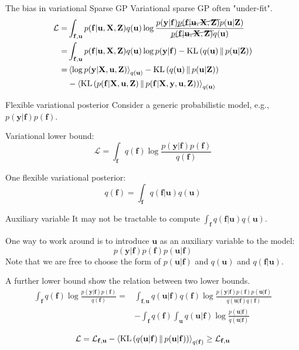 \documentclass[14pt,aspectratio=1610]{beamer}
\newcommand{\yV}{\mathbf{y}}
\newcommand{\fV}{\mathbf{f}}
\newcommand{\xM}{\mathbf{X}}
\newcommand{\uV}{\mathbf{u}}
\newcommand{\zM}{\mathbf{Z}}
\newcommand{\bound}{\mathcal{L}}
\begin{document}
\begin{frame}{The bias in variational Sparse GP}
Variational sparse GP often "under-fit".
\begin{align*}
\bound =& \int_{\fV, \uV} p(\fV| \uV, \xM, \zM) q(\uV) \log \frac{p(\yV | \fV) \cancel{p(\fV| \uV, \xM, \zM)} p(\uV | \zM)}{\cancel{p(\fV| \uV, \xM, \zM)} q(\uV)} \\
=& \int_{\fV, \uV} p(\fV| \uV, \xM, \zM) q(\uV) \log p(\yV | \fV)  - \KL{q(\uV)}{p(\uV| \zM)}\\
=& \expectation{\log p(\yV | \xM, \uV, \zM)}_{q(\uV)} - \KL{q(\uV)}{p(\uV| \zM)} \\
& - \expectation{\KL{p(\fV|\xM, \uV, \zM)}{p(\fV|\xM, \yV, \uV, \zM)}}_{q(\uV)}
\end{align*}
\end{frame}

\begin{frame}{Flexible variational posterior}
Consider a generic probabilistic model, e.g., $p(\yV | \fV) p(\fV)$.

Variational lower bound:
\[
\bound = \int_{\fV} q(\fV) \log \frac{p(\yV | \fV) p(\fV)}{q(\fV)}
\]

One flexible variational posterior:
\[
q(\fV) = \int_{\fV} q(\fV|\uV) q(\uV)
\]
\end{frame}

\begin{frame}{Auxiliary variable}
It may not be tractable to compute $ \int_{\fV} q(\fV|\uV) q(\uV)$.

One way to work around is to introduce $\uV$ as an auxiliary variable to the model:
\[
p(\yV | \fV) p(\fV) p(\uV|\fV)
\]
Note that we are free to choose the form of $p(\uV|\fV)$ and $q(\uV)$ and $q(\fV|\uV)$.
\end{frame}

\begin{frame}{A further lower bound}
show the relation between two lower bounds.
\begin{align*}
\int_{\fV} q(\fV) \log \frac{p(\yV | \fV) p(\fV)}{q(\fV)} =& \int_{\fV, \uV}q(\uV|\fV) q(\fV) \log \frac{p(\yV | \fV) p(\fV) p(\uV|\fV) }{q(\uV|\fV) q(\fV)} \\
& -  \int_{\fV} q(\fV) \int_{\uV} q(\uV|\fV)  \log \frac{p(\uV|\fV) }{q(\uV|\fV)}
\end{align*}

\begin{align*}
\bound = \bound_{\fV, \uV}  - \expectation{\KL{q(\uV|\fV)}{p(\uV|\fV)}}_{ q(\fV)} \geq \bound_{\fV, \uV}
\end{align*}
\end{frame}
\end{document}
